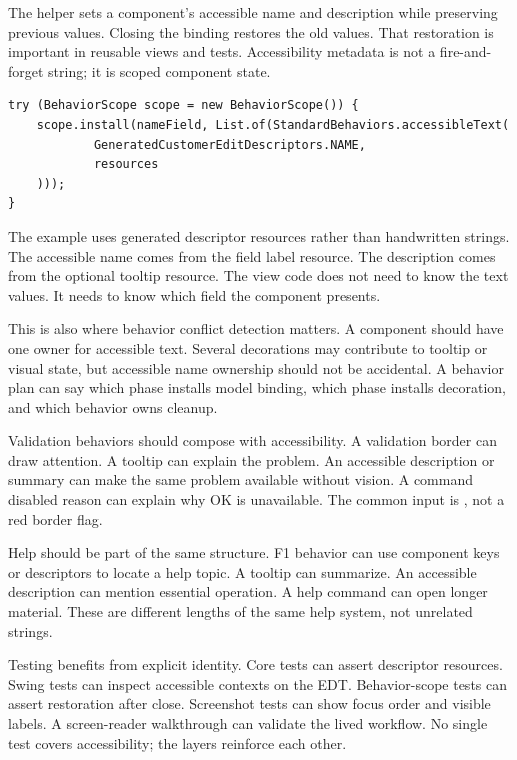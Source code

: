 The  helper sets a component's accessible name and description while preserving previous values. Closing the binding restores the old values. That restoration is important in reusable views and tests. Accessibility metadata is not a fire-and-forget string; it is scoped component state.

\begin{lstlisting}[caption={Descriptor-derived accessible text behavior.}]
try (BehaviorScope scope = new BehaviorScope()) {
    scope.install(nameField, List.of(StandardBehaviors.accessibleText(
            GeneratedCustomerEditDescriptors.NAME,
            resources
    )));
}
\end{lstlisting}

The example uses generated descriptor resources rather than handwritten strings. The accessible name comes from the field label resource. The description comes from the optional tooltip resource. The view code does not need to know the text values. It needs to know which field the component presents.

This is also where behavior conflict detection matters. A component should have one owner for accessible text. Several decorations may contribute to tooltip or visual state, but accessible name ownership should not be accidental. A behavior plan can say which phase installs model binding, which phase installs decoration, and which behavior owns cleanup.

Validation behaviors should compose with accessibility. A validation border can draw attention. A tooltip can explain the problem. An accessible description or summary can make the same problem available without vision. A command disabled reason can explain why OK is unavailable. The common input is , not a red border flag.

Help should be part of the same structure. F1 behavior can use component keys or descriptors to locate a help topic. A tooltip can summarize. An accessible description can mention essential operation. A help command can open longer material. These are different lengths of the same help system, not unrelated strings.

Testing benefits from explicit identity. Core tests can assert descriptor resources. Swing tests can inspect accessible contexts on the EDT. Behavior-scope tests can assert restoration after close. Screenshot tests can show focus order and visible labels. A screen-reader walkthrough can validate the lived workflow. No single test covers accessibility; the layers reinforce each other.

